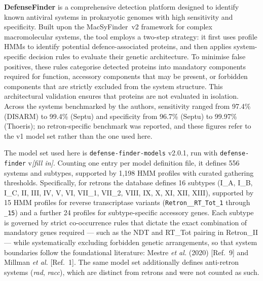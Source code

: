 \textbf{DefenseFinder} \cite{tesson2024}is a comprehensive detection platform designed to identify
known antiviral systems in prokaryotic genomes with high sensitivity and
specificity. Built upon the MacSyFinder~v2 framework for complex macromolecular
systems, the tool employs a two-step strategy: it first uses profile HMMs to
identify potential defence-associated proteins, and then applies system-specific
decision rules to evaluate their genetic architecture. To minimise false positives,
these rules categorise detected proteins into mandatory components required for
function, accessory components that may be present, or forbidden components that are
strictly excluded from the system structure. This architectural validation ensures that proteins are not evaluated in isolation. Across the systems benchmarked by the authors, sensitivity ranged from 97.4\% (DISARM) to 99.4\% (Septu) and specificity from 96.7\% (Septu) to 99.97\% (Thoeris); no retron-specific benchmark was reported, and these figures refer to the v1 model set rather than the one used here.



The model set used here is \texttt{defense-finder-models} v2.0.1, run with \texttt{defense-finder} v\emph{[fill in]}. Counting one entry per model definition file, it defines 556 systems and subtypes, supported by 1{,}198 HMM profiles with curated gathering thresholds. Specifically, for retrons the database defines 16 subtypes (I\_A, I\_B, I\_C, II,
III, IV, V, VI, VII\_1, VII\_2, VIII, IX, X, XI, XII, XIII), supported by 15 HMM
profiles for reverse transcriptase variants (\texttt{Retron\_\_RT\_Tot\_1} through
\texttt{\_15}) and a further 24 profiles for subtype-specific accessory genes. Each
subtype is governed by strict co-occurrence rules that dictate the exact combination
of mandatory genes required --- such as the NDT and RT\_Tot pairing in Retron\_II ---
while systematically excluding forbidden genetic arrangements, so that system
boundaries follow the foundational literature: Mestre \emph{et al.} (2020) [Ref.~9]
and Millman \emph{et al.} [Ref.~1]. The same model set additionally defines
anti-retron systems (\emph{rad}, \emph{racc}), which are distinct from retrons and
were not counted as such.

